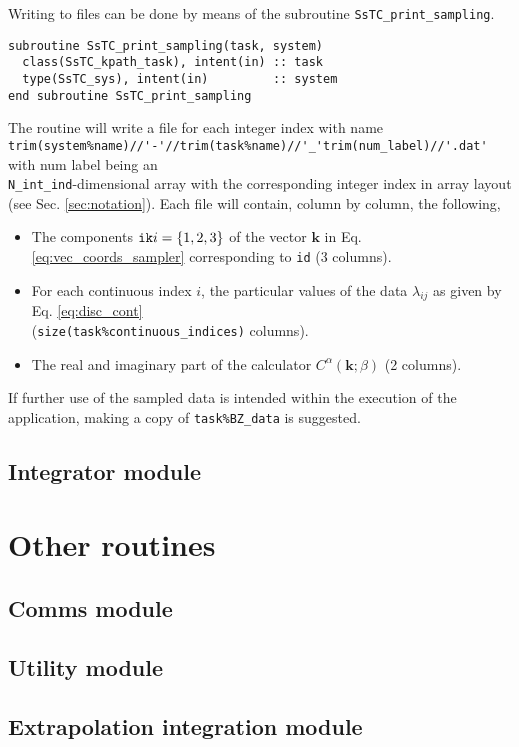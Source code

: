 \documentclass[10pt,a4paper]{article}
\begin{document}
Writing to files can be done by means of the subroutine \verb|SsTC_print_sampling|.
\begin{lstlisting}[caption={Interface of the ``kpath" printer.},captionpos=b]
subroutine SsTC_print_sampling(task, system)
  class(SsTC_kpath_task), intent(in) :: task
  type(SsTC_sys), intent(in)         :: system
end subroutine SsTC_print_sampling
\end{lstlisting}
The routine will write a file for each integer index with name \\ \verb|trim(system%name)//'-'//trim(task%name)//'_'trim(num_label)//'.dat'| with num label being an \\ \verb|N_int_ind|-dimensional array with the corresponding integer index in array layout (see Sec. \ref{sec:notation}). Each file will contain, column by column, the following,
\begin{itemize}
\item The components $\verb|ik|i=\{1, 2, 3\}$ of the vector $\bm{k}$ in Eq. \eqref{eq:vec_coords_sampler} corresponding to \verb|id| (3 columns).
\item For each continuous index $i$, the particular values of the data $\lambda_{ij}$ as given by Eq. \eqref{eq:disc_cont} \\ (\verb|size(task%continuous_indices)| columns).
\item The real and imaginary part of the calculator $C^{\alpha}(\bm{k};\beta)$ (2 columns).
\end{itemize}
If further use of the sampled data is intended within the execution of the application, making a copy of \verb|task%BZ_data| is suggested.
\subsection{Integrator module}
\section{Other routines}
\subsection{Comms module}
\subsection{Utility module}
\subsection{Extrapolation integration module}
\end{document}
